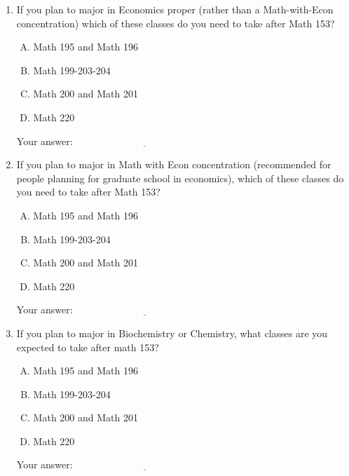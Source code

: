 \documentclass[10pt]{amsart}
\begin{document}
\begin{enumerate}
  
\item If you plan to major in Economics proper (rather than a
  Math-with-Econ concentration) which of these classes do you need to
  take after Math 153?

  \begin{enumerate}[(A)]
  \item Math 195 and Math 196
  \item Math 199-203-204
  \item Math 200 and Math 201
  \item Math 220
  \end{enumerate}

  \vspace{0.1in}
  Your answer: $\underline{\qquad\qquad\qquad\qquad\qquad\qquad\qquad}$
  \vspace{0.1in}

\item If you plan to major in Math with Econ concentration
  (recommended for people planning for graduate school in economics),
  which of these classes do you need to take after Math 153?

  \begin{enumerate}[(A)]
  \item Math 195 and Math 196
  \item Math 199-203-204
  \item Math 200 and Math 201
  \item Math 220
  \end{enumerate}

  \vspace{0.1in}
  Your answer: $\underline{\qquad\qquad\qquad\qquad\qquad\qquad\qquad}$
  \vspace{0.1in}

\item If you plan to major in Biochemistry or Chemistry, what classes
  are you expected to take after math 153?

  \begin{enumerate}[(A)]
  \item Math 195 and Math 196
  \item Math 199-203-204
  \item Math 200 and Math 201
  \item Math 220
  \end{enumerate}

  \vspace{0.1in}
  Your answer: $\underline{\qquad\qquad\qquad\qquad\qquad\qquad\qquad}$
  \vspace{0.1in}


\end{enumerate}
\end{document}
